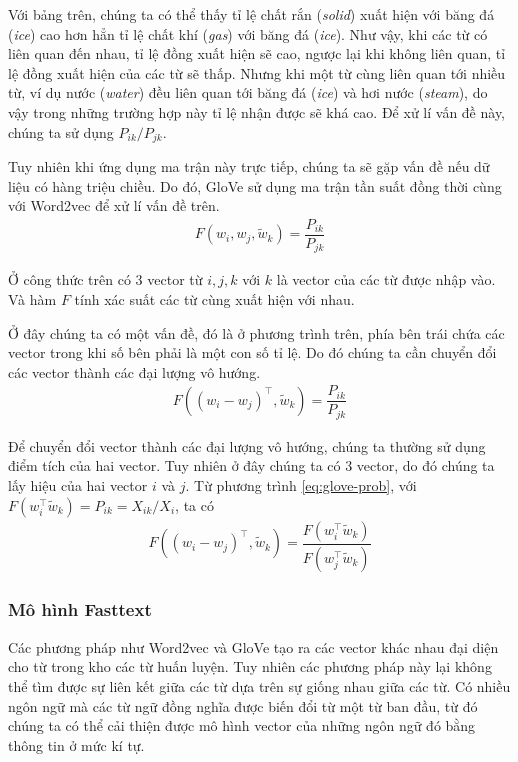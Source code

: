 Với bảng trên, chúng ta có thể thấy tỉ lệ chất rắn (\textit{solid}) xuất hiện với băng đá (\textit{ice}) cao hơn hẳn tỉ lệ chất khí (\textit{gas}) với băng đá (\textit{ice}). Như vậy, khi các từ có liên quan đến nhau, tỉ lệ đồng xuất hiện sẽ cao, ngược lại khi không liên quan, tỉ lệ đồng xuất hiện của các từ sẽ thấp. Nhưng khi một từ cùng liên quan tới nhiều từ, ví dụ nước (\textit{water}) đều liên quan tới băng đá (\textit{ice}) và hơi nước (\textit{steam}), do vậy trong những trường hợp này tỉ lệ nhận được sẽ khá cao. Để xử lí vấn đề này, chúng ta sử dụng $P_{ik}/P_{jk}$.

Tuy nhiên khi ứng dụng ma trận này trực tiếp, chúng ta sẽ gặp vấn đề nếu dữ liệu có hàng triệu chiều. Do đó, GloVe sử dụng ma trận tần suất đồng thời cùng với Word2vec để xử lí vấn đề trên.
\begin{align}
    F(w_i,w_j,\tilde w_k)=\dfrac{P_{ik}}{P_{jk}}
\end{align}

Ở công thức trên có $3$ vector từ $i,j,k$ với $k$ là vector của các từ được nhập vào. Và hàm $F$ tính xác suất các từ cùng xuất hiện với nhau.

Ở đây chúng ta có một vấn đề, đó là ở phương trình trên, phía bên trái chứa các vector trong khi số bên phải là một con số tỉ lệ. Do đó chúng ta cần chuyển đổi các vector thành các đại lượng vô hướng.
\begin{align}
    \label{eq:glove-prob}
    F((w_i-w_j)^\intercal,\tilde w_k)=\dfrac{P_{ik}}{P_{jk}}
\end{align}

Để chuyển đổi vector thành các đại lượng vô hướng, chúng ta thường sử dụng điểm tích của hai vector. Tuy nhiên ở đây chúng ta có $3$ vector, do đó chúng ta lấy hiệu của hai vector $i$ và $j$. Từ phương trình \ref{eq:glove-prob}, với $F(w_i^\intercal\tilde w_k)=P_{ik}=X_{ik}/X_i$, ta có
\begin{align}
    F((w_i-w_j)^\intercal,\tilde w_k)=\dfrac{F(w_i^\intercal\tilde w_k)}{F(w_j^\intercal\tilde w_k)}
\end{align}

\subsubsection{Mô hình Fasttext}
Các phương pháp như Word2vec và GloVe tạo ra các vector khác nhau đại diện cho từ trong kho các từ huấn luyện. Tuy nhiên các phương pháp này lại không thể tìm được sự liên kết giữa các từ dựa trên sự giống nhau giữa các từ. Có nhiều ngôn ngữ mà các từ ngữ đồng nghĩa được biến đổi từ một từ ban đầu, từ đó chúng ta có thể cải thiện được mô hình vector của những ngôn ngữ đó bằng thông tin ở mức kí tự.

